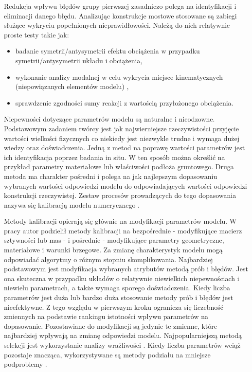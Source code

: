 Redukcja wpływu błędów grupy pierwszej zasadniczo polega na identyfikacji i eliminacji danego błędu. Analizując konstrukcje mostowe stosowane są zabiegi służące wykryciu popełnionych nieprawidłowości. Należą do nich relatywnie proste testy takie jak:
\begin{itemize}
	\item badanie symetrii/antysymetrii efektu obciążenia w przypadku symetrii/antysymetrii układu i obciążenia,
	\item wykonanie analizy modalnej w celu wykrycia miejsce kinematycznych (niepowiązanych elementów modelu) \parencite{Szafranski2013a}, 
	\item sprawdzenie zgodności sumy reakcji z wartością przyłożonego obciążenia. 
\end{itemize}


Niepewności dotyczące parametrów modelu są naturalne i nieodzowne. Podstawowym zadaniem twórcy jest jak najwierniejsze rzeczywistości przyjęcie wartości wielkości fizycznych co niekiedy jest niezwykle trudne i wymaga dużej wiedzy oraz doświadczenia. Jedną z metod na poprawę wartości parametrów jest ich  identyfikacja poprzez badania in situ. W ten sposób można określić na przykład parametry materiałowe lub właściwości podłoża gruntowego. Druga metoda ma charakter pośredni i polega na jak najlepszym dopasowaniu wybranych wartości odpowiedzi modelu do odpowiadających wartości odpowiedzi konstrukcji rzeczywistej. Zestaw procesów prowadzących do tego dopasowania nazywa się kalibracją modelu numerycznego . 

Metody kalibracji opierają się głównie na modyfikacji parametrów modelu. W pracy \cite{Batou2019} autor podzielił metody kalibracji na bezpośrednie - modyfikujące macierz sztywności lub mas - i pośrednie - modyfikujące parametry geometryczne, materiałowe i warunki brzegowe. Za zmianę charakterystyk modelu mogą odpowiadać algorytmy o różnym stopniu skomplikowania. Najbardziej podstawowym jest modyfikacja wybranych atrybutów metodą prób i błędów.  Jest ona skuteczna w przypadku układów o relatywnie niewielkich niepewnościach i niewielu parametrach, a także wymaga sporego doświadczenia. Kiedy liczba parametrów jest duża lub bardzo duża stosowanie metody prób i błędów jest nieefektywne. Z tego względu w pierwszym kroku ogranicza się liczebność zmiennych na podstawie rankingu istotności wpływu parametrów na dopasowanie. Pozostawiane do modyfikacji są jedynie te zmienne, które najbardziej wpływają na zmianę odpowiedzi modelu. Najpopularniejszą metodą selekcji jest wykorzystanie analizy wrażliwości \parencite{Friswell2001,Mottershead2011,Petersen2017,Batou2019}.  Kiedy liczba parametrów wciąż pozostaje znacząca, wykorzystywane są metody podziału na mniejsze podproblemy \parencite{Weng2020,Yu2016}. 


